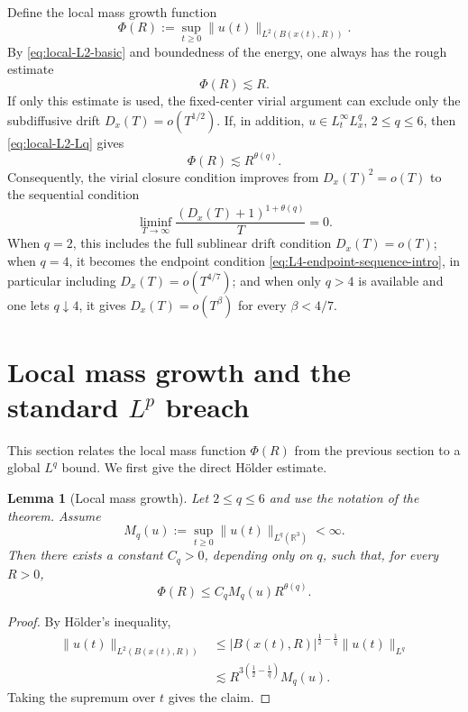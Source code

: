 \documentclass[smallextended,envcountsect,nospthms]{svjour3}
\numberwithin{equation}{section}
\theoremstyle{spbreak}
\newtheorem{lemma}[theorem]{Lemma}
\theoremstyle{spdefbreak}
\theoremstyle{spdefbreak}
\newcommand{\R}{\mathbb R}
\begin{document}
Define the local mass growth function
\begin{equation*}
  \Phi(R):=\sup_{t\ge0}\|u(t)\|_{L^2(B(x(t),R))}.
\end{equation*}
By \eqref{eq:local-L2-basic} and boundedness of the energy, one always has the rough estimate
\begin{equation*}
  \Phi(R)\lesssim R.
\end{equation*}
If only this estimate is used, the fixed-center virial argument can exclude only the subdiffusive drift $D_x(T)=o(T^{1/2})$. If, in addition, $u\in L_t^\infty L_x^q$, $2\le q\le6$, then \eqref{eq:local-L2-Lq} gives
\begin{equation*}
  \Phi(R)\lesssim R^{\theta(q)}.
\end{equation*}
Consequently, the virial closure condition improves from $D_x(T)^2=o(T)$ to the sequential condition
\begin{equation*}
  \liminf_{T\to\infty}
  \frac{(D_x(T)+1)^{1+\theta(q)}}{T}=0.
\end{equation*}
When $q=2$, this includes the full sublinear drift condition $D_x(T)=o(T)$; when $q=4$, it becomes the endpoint condition \eqref{eq:L4-endpoint-sequence-intro}, in particular including $D_x(T)=o(T^{4/7})$; and when only $q>4$ is available and one lets $q\downarrow4$, it gives $D_x(T)=o(T^\beta)$ for every $\beta<4/7$.

\section{Local mass growth and the standard \texorpdfstring{$L^p$}{Lp} breach}\label{sec:Lq}

This section relates the local mass function $\Phi(R)$ from the previous section to a global $L^q$ bound. We first give the direct H\"older estimate.

\begin{lemma}[Local mass growth]\label{lem:local-mass-Lq}
Let $2\le q\le6$ and use the notation of the theorem. Assume
\begin{equation*}
  M_q(u):=\sup_{t\ge0}\|u(t)\|_{L^q(\R^3)}<\infty.
\end{equation*}
Then there exists a constant $C_q>0$, depending only on $q$, such that, for every $R>0$,
\begin{equation*}
  \Phi(R)
  \le C_q M_q(u)R^{\theta(q)}.
\end{equation*}
\end{lemma}

\begin{proof}
By H\"older's inequality,
\begin{align*}
  \|u(t)\|_{L^2(B(x(t),R))}
  &\le |B(x(t),R)|^{\frac12-\frac1q}\|u(t)\|_{L^q}\\
  &\lesssim R^{3(\frac12-\frac1q)}M_q(u).
\end{align*}
Taking the supremum over $t$ gives the claim.
\end{proof}
\end{document}
